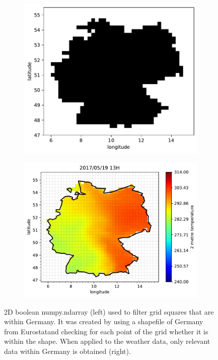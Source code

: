 \begin{figure}[h!]%
	\centering
	\begin{subfigure}{.5\textwidth}
		\centering
		\includegraphics[width=.85\textwidth]{plots/isinDE}%
		\label{fig:isinDE}%
	\end{subfigure}%
	\begin{subfigure}{.5\textwidth}
		\centering
		\includegraphics[width=.95\textwidth]{plots/t2m/maxvar/0_map_isin}%
		\label{fig:t2m_maxvar_0_map_isin}%
	\end{subfigure}
	\caption[2D boolean numpy.ndarray (left) used to filter grid squares within Germany. It was created by using a shapefile of Germany from Eurostat and checking for each point of the grid if it is within the shapefile. When applied to the weather data, only relevant data within Germany is obtained (right).]{2D boolean numpy.ndarray (left) used to filter grid squares that are within Germany. It was created by using a shapefile of Germany from Eurostat\footnotemark and checking for each point of the grid whether it is within the shape. When applied to the weather data, only relevant data within Germany is obtained (right).}
	\label{fig:isin_compare}
\end{figure}

